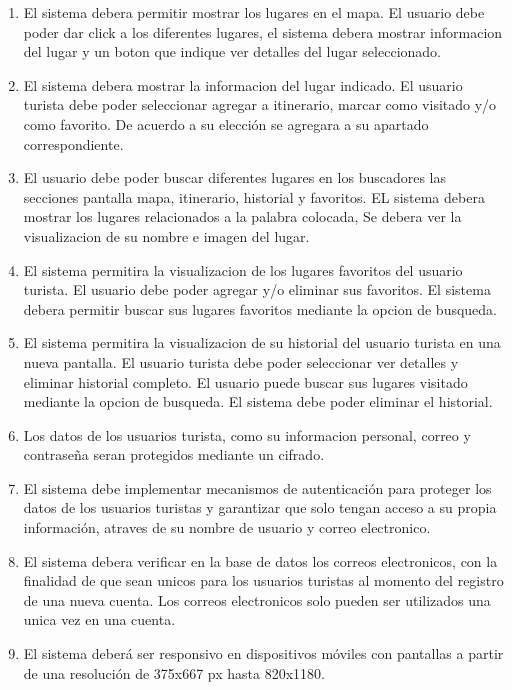 \documentclass{article}
\begin{document}
\begin{enumerate}
\item El sistema debera permitir mostrar los lugares en el mapa. El usuario debe poder dar click a los diferentes lugares, el sistema debera mostrar informacion del lugar y un boton que indique ver detalles del lugar seleccionado.

\item El sistema debera mostrar la informacion del lugar indicado. El usuario turista debe poder seleccionar agregar a itinerario, marcar como visitado y/o como favorito. De acuerdo a su elección se agregara a su apartado correspondiente.

\item El usuario debe poder buscar diferentes lugares en los buscadores las secciones pantalla mapa, itinerario, historial y favoritos. EL sistema debera mostrar los lugares relacionados a la palabra colocada, Se debera ver la visualizacion de su nombre e imagen del lugar.

\item El sistema permitira la visualizacion de los lugares favoritos del usuario turista. El usuario debe poder agregar y/o eliminar sus favoritos. El sistema debera permitir buscar sus lugares favoritos mediante la opcion de busqueda.

\item El sistema permitira la visualizacion de su historial del usuario turista en una nueva pantalla. El usuario turista debe poder seleccionar ver detalles y eliminar historial completo. El usuario puede buscar sus lugares visitado mediante la opcion de busqueda. El sistema debe poder eliminar el historial.
    
    \item Los datos de los usuarios turista, como su informacion personal, correo y contraseña seran protegidos mediante un cifrado.
    
    \item El sistema debe implementar mecanismos de autenticación para proteger los datos de los usuarios turistas y garantizar que solo tengan acceso a su propia información, atraves de su nombre de usuario y correo electronico.

    \item El sistema debera verificar en la base de datos los correos electronicos, con la finalidad de que sean unicos para los usuarios turistas al momento del registro de una nueva cuenta. Los correos electronicos solo pueden ser utilizados una unica vez en una cuenta.

    \item El sistema deberá ser responsivo en dispositivos móviles con pantallas a partir de una resolución de 375x667 px hasta 820x1180.
    

\end{enumerate}
\end{document}
